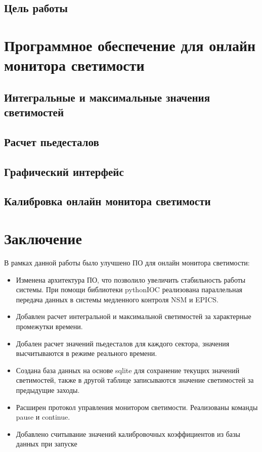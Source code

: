 \documentclass[a4paper, 12pt]{article}
\begin{document}
    \subsection{Цель работы}
    

\section{Программное обеспечение для онлайн монитора светимости}
    \subsection{Интегральные и максимальные значения светимостей}
    
    \subsection{Расчет пьедесталов}
    
    \subsection{Графический интерфейс}
    
    \subsection{Калибровка онлайн монитора светимости}
    

\section{Заключение}
    В рамках данной работы было улучшено ПО для онлайн монитора светимости:
    \begin{itemize}
        \item Изменена архитектура ПО, что позволило увеличить стабильность работы системы. При помощи библиотеки pythonIOC реализована параллельная передача данных в системы медленного контроля NSM и EPICS.
        \item Добавлен расчет интегральной и максимальной светимостей за характерные промежутки времени.
        \item Добален расчет значений пьедесталов для каждого сектора, значения высчитываются в режиме реального времени.
        \item Создана база данных на основе sqlite для сохранение текущих значений светимостей, также в другой таблице записываются значение светимостей за предыдущие заходы.
        \item Расширен протокол управления монитором светимости. Реализованы команды pause и continue.
        \item Добавлено считывание значений калибровочных коэффициентов из базы данных при запуске
    \end{itemize}
    
\end{document}
